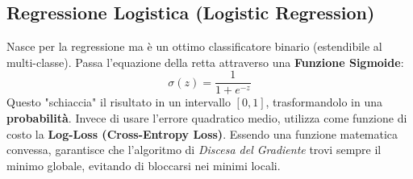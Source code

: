 \subsection{Regressione Logistica (Logistic Regression)}
Nasce per la regressione ma è un ottimo classificatore binario (estendibile al multi-classe). Passa l'equazione della retta attraverso una \textbf{Funzione Sigmoide}:
\begin{equation}
    \sigma(z) = \frac{1}{1 + e^{-z}}
\end{equation}
Questo "schiaccia" il risultato in un intervallo $[0, 1]$, trasformandolo in una \textbf{probabilità}.
Invece di usare l'errore quadratico medio, utilizza come funzione di costo la \textbf{Log-Loss (Cross-Entropy Loss)}.
Essendo una funzione matematica convessa, garantisce che l'algoritmo di \textit{Discesa del Gradiente} trovi sempre il minimo globale, evitando di bloccarsi nei minimi locali.
